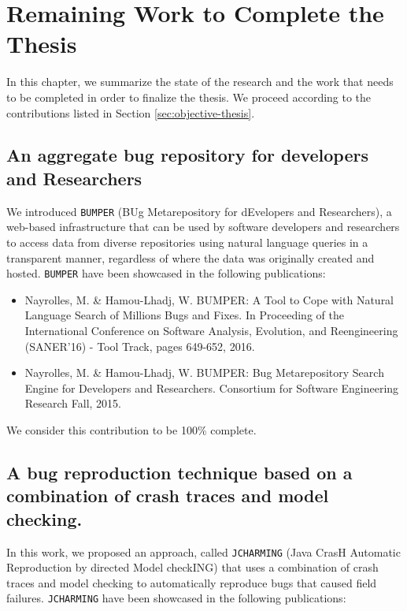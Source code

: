
\chapter{Remaining Work to Complete the Thesis\label{chap:plan}}

In this chapter, we summarize the state of the research and the work that needs to be completed in order to finalize the thesis.
We proceed according to the contributions listed in Section \ref{sec:objective-thesis}.


\section{An aggregate bug  repository for  developers  and  Researchers}

We introduced {\tt BUMPER} (BUg Metarepository for  dEvelopers  and  Researchers),  a  web-based  infrastructure
that  can  be  used  by  software  developers  and  researchers  to access  data  from  diverse  repositories  using  natural  language queries in a transparent manner, regardless of where the data was originally created and hosted.
{\tt BUMPER} have been showcased in the following publications:

\begin{itemize}
	\item Nayrolles, M. \& Hamou-Lhadj, W. BUMPER: A Tool to Cope with Natural Language Search of Millions Bugs and Fixes. In Proceeding of the International Conference on Software Analysis, Evolution, and Reengineering (SANER'16) - Tool Track, pages 649-652, 2016.
	\item Nayrolles, M. \& Hamou-Lhadj, W. BUMPER: Bug Metarepository Search Engine for Developers and Researchers. Consortium for Software Engineering Research Fall, 2015.
\end{itemize}

We consider this contribution to be 100\% complete.

\section{A bug reproduction technique based on a combination of crash traces and model checking.}

In this work, we proposed an approach, called {\tt JCHARMING} (Java CrasH Automatic Reproduction by directed Model checkING) that uses a combination of crash traces and model checking to automatically reproduce bugs that caused field failures.
{\tt JCHARMING} have been showcased in the following publications:

